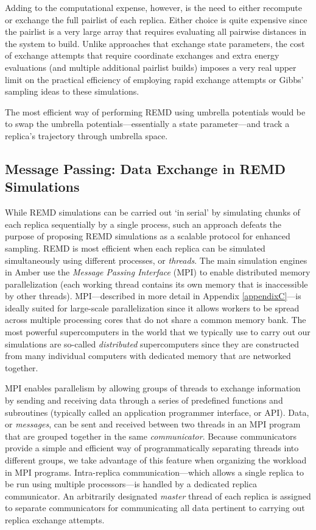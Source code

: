 Adding to the computational expense, however, is the need to either recompute or
exchange the full pairlist of each replica. Either choice is quite expensive
since the pairlist is a very large array that requires evaluating all pairwise
distances in the system to build. Unlike approaches that exchange state
parameters, the cost of exchange attempts that require coordinate exchanges and
extra energy evaluations (and multiple additional pairlist builds) imposes a
very real upper limit on the practical efficiency of employing rapid exchange
attempts or Gibbs' sampling ideas to these simulations.

The most efficient way of performing REMD using umbrella potentials would be to
swap the umbrella potentials---essentially a state parameter---and track a
replica's trajectory through umbrella space.

\subsection{Message Passing: Data Exchange in REMD Simulations}

While REMD simulations can be carried out `in serial' by simulating chunks of
each replica sequentially by a single process, such an approach defeats the
purpose of proposing REMD simulations as a scalable protocol for enhanced
sampling. REMD is most efficient when each replica can be simulated
simultaneously using different processes, or \emph{threads}. The main simulation
engines in Amber use the \emph{Message Passing Interface} (MPI) to enable
distributed memory parallelization (\ie each working thread contains its own
memory that is inaccessible by other threads). MPI---described in more detail in
Appendix \ref{appendixC}---is ideally suited for large-scale parallelization
since it allows workers to be spread across multiple processing cores that do
not share a common memory bank. The most powerful supercomputers in the world
that we typically use to carry out our simulations are so-called
\emph{distributed} supercomputers since they are constructed from many
individual computers with dedicated memory that are networked together.

MPI enables parallelism by allowing groups of threads to exchange information by
sending and receiving data through a series of predefined functions and
subroutines (typically called an application programmer interface, or API).
Data, or \emph{messages}, can be sent and received between two threads in an MPI
program that are grouped together in the same \emph{communicator}. Because
communicators provide a simple and efficient way of programmatically separating
threads into different groups, we take advantage of this feature when organizing
the workload in MPI programs. Intra-replica communication---which allows a
single replica to be run using multiple processors---is handled by a dedicated
replica communicator. An arbitrarily designated \emph{master} thread of each
replica is assigned to separate communicators for communicating all data
pertinent to carrying out replica exchange attempts.

